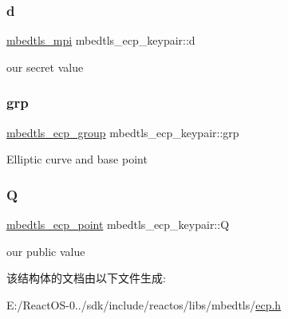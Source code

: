 \subsubsection{\texorpdfstring{d}{d}}
{\footnotesize\ttfamily \hyperlink{structmbedtls__mpi}{mbedtls\+\_\+mpi} mbedtls\+\_\+ecp\+\_\+keypair\+::d}

our secret value \mbox{\label{structmbedtls__ecp__keypair_ab5b77c1c63b7396b6869545b121d8828}} 
\subsubsection{\texorpdfstring{grp}{grp}}
{\footnotesize\ttfamily \hyperlink{structmbedtls__ecp__group}{mbedtls\+\_\+ecp\+\_\+group} mbedtls\+\_\+ecp\+\_\+keypair\+::grp}

Elliptic curve and base point \mbox{\label{structmbedtls__ecp__keypair_a30cb41708701bb9ed9bdba5972a2ccea}} 
\subsubsection{\texorpdfstring{Q}{Q}}
{\footnotesize\ttfamily \hyperlink{structmbedtls__ecp__point}{mbedtls\+\_\+ecp\+\_\+point} mbedtls\+\_\+ecp\+\_\+keypair\+::Q}

our public value 

该结构体的文档由以下文件生成\+:\begin{DoxyCompactItemize}
\item 
E\+:/\+React\+O\+S-\/0../sdk/include/reactos/libs/mbedtls/\hyperlink{ecp_8h}{ecp.\+h}\end{DoxyCompactItemize}
